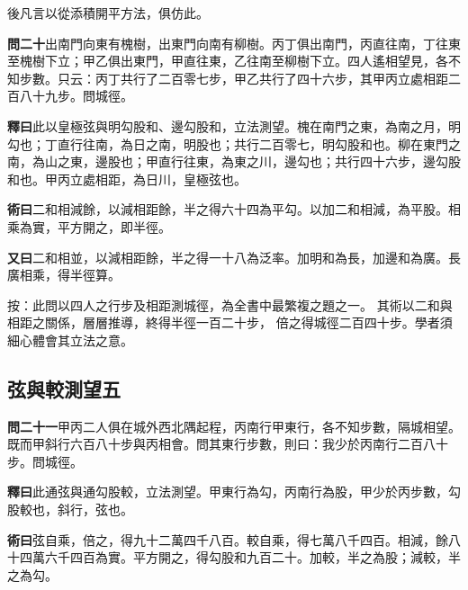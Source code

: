 \documentclass[12pt,a4paper]{article}
\newcommand{\Section}[1]{\subsection*{#1}}
\begin{document}
後凡言以從添積開平方法，俱仿此。

\vspace{0.5em}

\noindent\textbf{問二十}\quad 出南門向東有槐樹，出東門向南有柳樹。丙丁俱出南門，丙直往南，丁往東至槐樹下立；甲乙俱出東門，甲直往東，乙往南至柳樹下立。四人遙相望見，各不知步數。只云：丙丁共行了二百零七步，甲乙共行了四十六步，其甲丙立處相距二百八十九步。問城徑。

\vspace{0.3em}

\noindent\textbf{釋曰}\quad 此以皇極弦與明勾股和、邊勾股和，立法測望。槐在南門之東，為南之月，明勾也；丁直行往南，為日之南，明股也；共行二百零七，明勾股和也。柳在東門之南，為山之東，邊股也；甲直行往東，為東之川，邊勾也；共行四十六步，邊勾股和也。甲丙立處相距，為日川，皇極弦也。

\vspace{0.3em}

\noindent\textbf{術曰}\quad 二和相減餘，以減相距餘，半之得六十四為平勾。以加二和相減，為平股。相乘為實，平方開之，即半徑。

\vspace{0.3em}

\noindent\textbf{又曰}\quad 二和相並，以減相距餘，半之得一十八為泛率。加明和為長，加邊和為廣。長廣相乘，得半徑算。

\vspace{0.5em}

\noindent
按：此問以四人之行步及相距測城徑，為全書中最繁複之題之一。
其術以二和與相距之關係，層層推導，終得半徑一百二十步，
倍之得城徑二百四十步。學者須細心體會其立法之意。

\Section{弦與較測望五}

\noindent\textbf{問二十一}\quad 甲丙二人俱在城外西北隅起程，丙南行甲東行，各不知步數，隔城相望。既而甲斜行六百八十步與丙相會。問其東行步數，則曰：我少於丙南行二百八十步。問城徑。

\vspace{0.3em}

\noindent\textbf{釋曰}\quad 此通弦與通勾股較，立法測望。甲東行為勾，丙南行為股，甲少於丙步數，勾股較也，斜行，弦也。

\vspace{0.3em}

\noindent\textbf{術曰}\quad 弦自乘，倍之，得九十二萬四千八百。較自乘，得七萬八千四百。相減，餘八十四萬六千四百為實。平方開之，得勾股和九百二十。加較，半之為股；減較，半之為勾。
\end{document}
